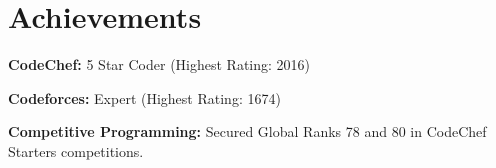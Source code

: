 \documentclass[letterpaper,10pt]{article}
\newenvironment{resume_list}{
  \vspace{-7pt}
  \begin{itemize}[itemsep=-2px, parsep=1pt, leftmargin=30pt]
}{
  \end{itemize}
}
\begin{document}
  \section{Achievements}
  \begin{resume_list}
    \item \textbf{CodeChef:} 5 Star Coder (Highest Rating: 2016)
    \item \textbf{Codeforces:} Expert (Highest Rating: 1674)
    \item \textbf{Competitive Programming:} Secured Global Ranks 78 and 80 in CodeChef Starters competitions.
  \end{resume_list}
\end{document}
